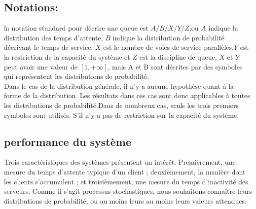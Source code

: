 \documentclass[a4paper,12pt]{report}
\begin{document}
\subsection{Notations: }
la notation standard pour décrire une queue est $A/B/X/Y/Z$,ou $A$ indique la distribution des temps d'attente, $B$ indique la distribution de probabilité décrivant le temps de service, $X$ est le nombre de voies de service parallèles,$Y$ est la restriction de la capacité du système et $Z$ est la discipline de queue, $X$ et $Y$ peut avoir une valeur de $\left [ 1,+\infty \right ]$, mais A et B sont décrites par des symboles qui représentent les distributions de probabilité.\\
Dans le cas de la distribution générale, il n'y a aucune hypothèse quant à la forme de la distribution. Les résultats dans ces cas sont donc applicables à toutes les distributions de probabilité.Dans de nombreux cas, seuls les trois premiers symboles sont utilisés. S'il n'y a pas de restriction sur la capacité du système.
\subsection{performance du système}
Trois caractéristiques des systèmes présentent un intérêt. Premièrement, une mesure du temps d'attente typique d'un client ; deuxièmement, la manière dont les clients s'accumulent ; et troisièmement, une mesure du temps d'inactivité des serveurs. Comme il s'agit processus stochastiques, nous souhaitons connaître leurs distributions de probabilité, ou au moins leurs au moins leurs valeurs attendues.
\end{document}
